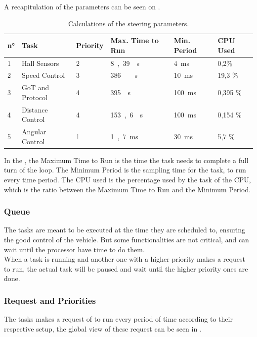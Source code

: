A recapitulation of the parameters can be seen on .

\begin{table} [H]
	\begin{tabular}{|l|l|l|l|l|l|}
								
\hline
\textbf{n°}  & \textbf{Task}   	 & \textbf{Priority}	& \textbf{Max. Time to Run} 	& \textbf{Min. Period} & \textbf{CPU Used}\\
\hline
1			 &	Hall Sensors	 & 2				&	\si{8,39 \mu s}			    &	\si{4 ms}			  & 0,2\%	  \\
\hline
2			 &	Speed Control	 & 3				&	\si{386\ \mu s}				&	\si{10 ms}			  &	19,3 \%   \\
\hline
3			 &	GoT and Protocol & 4				&	\si{395 \mu s}			    &	\si{100 ms}			  &	0,395 \%  \\
\hline
4			 &	Distance Control & 4				&	\si{153,6 \mu s} 			&	\si{100 ms} 	  	  &	0,154 \%  \\
\hline
5			 &	Angular Control	 & 1				&	\si{1,7  ms}			    &	\si{30 ms}			  &	5,7 \%    \\
\hline		
	\end{tabular}
	\caption{Calculations of the steering parameters.}	
	\label{scheduleParameters}						
\end{table}	

In the , the Maximum Time to Run is the time the task needs to complete a full turn of the loop. The Minimum Period is the sampling time for the task, to run every time period. The CPU used is the percentage used by the task of the CPU, which is the ratio between the Maximum Time to Run and the Minimum Period.

\subsubsection{Queue}
The tasks are meant to be executed at the time they are scheduled to, ensuring the good control of the vehicle. But some functionalities are not critical, and can wait until the processor have time to do them.\\
When a task is running and another one with a higher priority makes a request to run, the actual task will be paused and wait until the higher priority ones are done.

\subsubsection{Request and Priorities}
The tasks makes a request of to run every period of time according to their respective setup, the global view of these request can be seen in .


